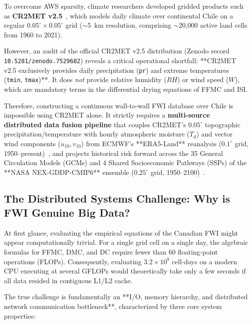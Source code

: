 \documentclass[10pt,conference]{IEEEtran}
\begin{document}
To overcome AWS sparsity, climate researchers developed gridded products such as \textbf{CR2MET v2.5}~\cite{boisier2023cr2met}, which models daily climate over continental Chile on a regular $0.05^\circ \times 0.05^\circ$ grid ($\sim$5~km resolution, comprising $\sim$20,000 active land cells from 1960 to 2021). 

However, an audit of the official CR2MET v2.5 distribution (Zenodo record \texttt{10.5281/zenodo.7529682}) reveals a critical operational shortfall: **CR2MET v2.5 exclusively provides daily precipitation (\texttt{pr}) and extreme temperatures (\texttt{tmin}, \texttt{tmax})**. It does \textit{not} provide relative humidity ($RH$) or wind speed ($W$), which are mandatory terms in the differential drying equations of FFMC and ISI. 

Therefore, constructing a continuous wall-to-wall FWI database over Chile is impossible using CR2MET alone. It strictly requires a \textbf{multi-source distributed data fusion pipeline} that couples CR2MET's $0.05^\circ$ topographic precipitation/temperature with hourly atmospheric moisture ($T_d$) and vector wind components ($u_{10}, v_{10}$) from ECMWF's **ERA5-Land** reanalysis ($0.1^\circ$ grid, 1950--present)~\cite{munoz2021era5land}, and projects historical risk forward across the 35 General Circulation Models (GCMs) and 4 Shared Socioeconomic Pathways (SSPs) of the **NASA NEX-GDDP-CMIP6** ensemble ($0.25^\circ$ grid, 1950--2100)~\cite{quilcaille2023fire}.

\subsection{The Distributed Systems Challenge: Why is FWI Genuine Big Data?}
At first glance, evaluating the empirical equations of the Canadian FWI might appear computationally trivial. For a single grid cell on a single day, the algebraic formulas for FFMC, DMC, and DC require fewer than 60 floating-point operations (FLOPs). Consequently, evaluating $3.2 \times 10^8$ cell-days on a modern CPU executing at several GFLOPs would theoretically take only a few seconds if all data resided in contiguous L1/L2 cache. 

The true challenge is fundamentally an **I/O, memory hierarchy, and distributed network communication bottleneck**, characterized by three core system properties:
\end{document}
